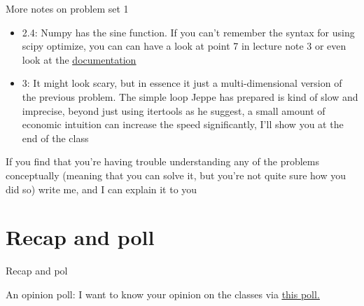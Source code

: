 \documentclass[10pt,danish,t,10pt]{beamer}
\begin{document}
\begin{frame}{More notes on problem set 1}
    \begin{itemize}
        \item 2.4: Numpy has the sine function. If you can't remember the syntax for using scipy optimize, you can can have a look at point 7 in lecture note 3 or even look at the \href{https://docs.scipy.org/doc/scipy/reference/optimize.html}{\underline{documentation}}
        \item 3: It might look scary, but in essence it just a multi-dimensional version of the previous problem. The simple loop Jeppe has prepared is kind of slow and imprecise, beyond just using itertools as he suggest, a small amount of economic intuition can increase the speed significantly, I'll show you at the end of the class
    \end{itemize}
    If you find that you're having trouble understanding any of the problems conceptually (meaning that you can solve it, but you're not quite sure how you did so) write me, and I can explain it to you
\end{frame}


\section{Recap and poll}
\begin{frame}{Recap and pol}
\begin{alertblock}{An opinion poll:}
    I want to know your opinion on the classes via \href{https://forms.office.com/Pages/ResponsePage.aspx?id=kX-So6HNlkaviYyfHO_6keqQaX6yJ3ZCtwv_fJfDA0xUQk1IREFWWFgzUURFMzhCTFRUTENaNENIWCQlQCN0PWcu}{\underline{this poll.}}
\end{alertblock}

\end{frame}
\end{document}
